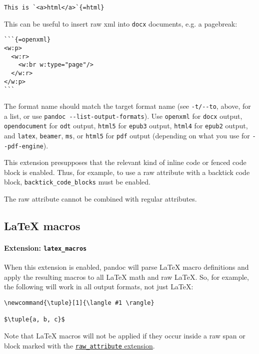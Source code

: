 \documentclass[
]{article}
\begin{document}
\begin{verbatim}
This is `<a>html</a>`{=html}
\end{verbatim}

This can be useful to insert raw xml into \texttt{docx} documents, e.g.
a pagebreak:

\begin{verbatim}
```{=openxml}
<w:p>
  <w:r>
    <w:br w:type="page"/>
  </w:r>
</w:p>
```
\end{verbatim}

The format name should match the target format name (see
\texttt{-t/-\/-to}, above, for a list, or use
\texttt{pandoc\ -\/-list-output-formats}). Use \texttt{openxml} for
\texttt{docx} output, \texttt{opendocument} for \texttt{odt} output,
\texttt{html5} for \texttt{epub3} output, \texttt{html4} for
\texttt{epub2} output, and \texttt{latex}, \texttt{beamer}, \texttt{ms},
or \texttt{html5} for \texttt{pdf} output (depending on what you use for
\texttt{-\/-pdf-engine}).

This extension presupposes that the relevant kind of inline code or
fenced code block is enabled. Thus, for example, to use a raw attribute
with a backtick code block, \texttt{backtick\_code\_blocks} must be
enabled.

The raw attribute cannot be combined with regular attributes.

\subsection{LaTeX macros}\label{latex-macros}

\paragraph{\texorpdfstring{Extension:
\texttt{latex\_macros}}{Extension: latex\_macros}}\label{extension-latex_macros}

When this extension is enabled, pandoc will parse LaTeX macro
definitions and apply the resulting macros to all LaTeX math and raw
LaTeX. So, for example, the following will work in all output formats,
not just LaTeX:

\begin{verbatim}
\newcommand{\tuple}[1]{\langle #1 \rangle}

$\tuple{a, b, c}$
\end{verbatim}

Note that LaTeX macros will not be applied if they occur inside a raw
span or block marked with the
\hyperref[extension-raw_attribute]{\texttt{raw\_attribute} extension}.
\end{document}
